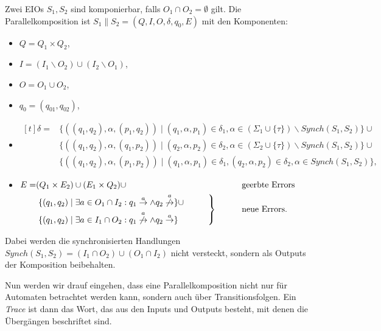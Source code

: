 \begin{Def}[Parallelkomposition]
  Zwei EIOs $S_1, S_2$ sind komponierbar, falls
  $O_1\cap O_2=\emptyset$ gilt. Die Parallelkomposition ist
  $S_1\|S_2=(Q,I,O,\delta ,q_0,E)$ mit den Komponenten:
  \begin{itemize}
    \item $Q=Q_1\times Q_2$,
    \item $I=(I_1\backslash O_2)\cup(I_2\backslash O_1)$,
    \item $O=O_1\cup O_2$,
    \item $q_0=(q_{01},q_{02})$,
    \item $\begin{aligned}[t]
    \delta =&\{((q_1,q_2),\alpha ,(p_1,q_2))\mid (q_1,\alpha ,p_1)\in\delta
      _1,\alpha\in(\Sigma _1\cup\{\tau\})\backslash Synch(S_1,S_2)\}\cup\\
      &\{((q_1,q_2),\alpha ,(q_1,p_2))\mid (q_2,\alpha ,p_2)\in\delta
      _2,\alpha\in(\Sigma _2\cup\{\tau\})\backslash Synch(S_1,S_2)\}\cup\\
      &\{((q_1,q_2),\alpha ,(p_1,p_2))\mid (q_1,\alpha ,p_1)\in\delta
      _1, (q_2,\alpha ,p_2)\in\delta _2, \alpha\in Synch(S_1,S_2)\},
  \end{aligned}$
    \item $\begin{aligned}[t]
        E=&(Q_1\times E_2)\cup (E_1\times Q_2)\cup
        &&\phantom{neue}\mathrm{geerbte}~\mathrm{Errors}\\
        &\left.\begin{aligned}
        &\{(q_1,q_2)\mid \exists a\in O_1\cap I_2: q_1\overset{a}{\rightarrow}\wedge
      q_2\overset{a}{\not{\hspace{-0.1cm}\rightarrow}}\}\cup\\
      &\{(q_1,q_2)\mid \exists a\in I_1\cap O_2:
q_1\overset{a}{\not{\hspace{-0.1cm}\rightarrow}}\wedge
q_2\overset{a}{\rightarrow}\}
\end{aligned}\hspace{1cm}\right\}
      &&\phantom{neue}\mathrm{neue}~\mathrm{Errors}.\\
  \end{aligned}$
  \end{itemize}
  Dabei werden die synchronisierten Handlungen $Synch(S_1,
  S_2)=(I_1\cap O_2)\cup(O_1\cap I_2)$ nicht versteckt, sondern als Outputs der
  Komposition beibehalten.
\end{Def}

Nun werden wir drauf eingehen, dass eine Parallelkomposition nicht nur für
Automaten betrachtet werden kann, sondern auch über Transitionsfolgen. Ein
\emph{Trace} ist dann das Wort, das aus den Inputs und Outputs besteht, mit denen die
Übergängen beschriftet sind.

